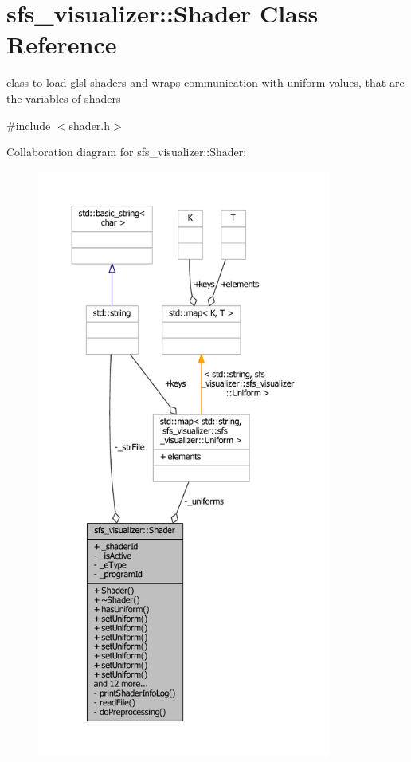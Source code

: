 \section{sfs\-\_\-visualizer\-:\-:Shader Class Reference}
\label{classsfs__visualizer_1_1Shader}


class to load glsl-\/shaders and wraps communication with uniform-\/values, that are the variables of shaders  




{\ttfamily \#include $<$shader.\-h$>$}



Collaboration diagram for sfs\-\_\-visualizer\-:\-:Shader\-:\nopagebreak
\begin{figure}[H]
\begin{center}
\leavevmode
\includegraphics[height=550pt]{d2/d83/classsfs__visualizer_1_1Shader__coll__graph}
\end{center}
\end{figure}
